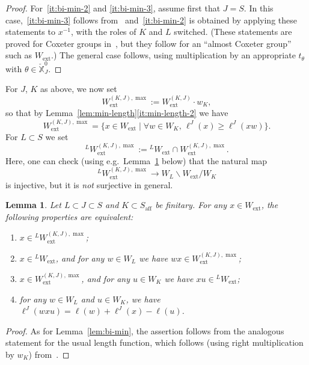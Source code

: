 \documentclass[11pt]{amsart}
\numberwithin{equation}{section}
\theoremstyle{plain}
\newtheorem{lem}[thm]{Lemma}
\theoremstyle{definition}
\newcommand{\X}{{\mathbb X}}
\newcommand{\Xd}{\check{\X}}
\newcommand{\ex}{\mathrm{ext}}
\newcommand{\af}{\mathrm{aff}}
\begin{document}
\begin{proof}
For~\eqref{it:bi-min-2} and \eqref{it:bi-min-3}, assume first that $J=S$. In this case,~\eqref{it:bi-min-3} follows from~\cite[Lemma~2.1.9 and Theorem~2.1.12]{geck-pfeiffer} and~\eqref{it:bi-min-2} is obtained by applying these statements to $x^{-1}$, with the roles of $K$ and $L$ switched. (These statements are proved for Coxeter groups in~\cite{geck-pfeiffer}, but they follow for an ``almost Coxeter group'' such as $W_\ex$.)
The general case follows,
using multiplication by an appropriate $t_\theta$ with $\theta \in \Xd_J^0$.
\end{proof}

For $J$, $K$ as above, we now set
\[
W_\ex^{(K,J),\max} := W_\ex^{(K,J)} \cdot w_K,
\]
so that by Lemma~\ref{lem:min-length}\eqref{it:min-length-2}
we have
\[
W_\ex^{(K,J),\max} = \{x \in W_\ex \mid \forall w\in W_K, \, \ell^{J}(x)\geq \ell^{J}(xw) \}.
\]
For $L\subset S$ we set 
\[
{}^{L}W_\ex^{(K,J),\max}:={}^{L}W_\ex\cap W_\ex^{(K,{J}),\max}. 
\]
Here, one can check (using e.g.~Lemma~\ref{lem:quar-min-max} below) that the natural map
\[
{}^{L}W_\ex^{(K,J),\max} \to W_{L} \backslash W_\ex / W_K
\]
is injective, but it is \emph{not} surjective in general.

\begin{lem}
\label{lem:quar-min-max}
Let $L \subset J\subset S$ and $K\subset S_\af$ be finitary.
For 
any $x\in W_\ex$, the following properties are equivalent:
\begin{enumerate}
\item 
$x\in {}^{L} W_\ex^{(K,J),\max}$; 
\item 
$x\in {}^{L} W_\ex$, and for any $w\in W_{L}$ we have $wx\in W_\ex^{(K,J),\max}$; 
\item 
$x\in W_\ex^{(K,J),\max}$, and for any $u\in W_K$ we have $xu\in {}^{L} W_\ex$; 
\item 
for any $w\in W_{L}$ and $u\in W_K$, we have $\ell^J(wxu)=\ell(w)+\ell^J(x)-\ell(u)$. 
\end{enumerate}
\end{lem}

\begin{proof}
As for Lemma~\ref{lem:bi-min}, the assertion follows from the analogous statement for the usual length function, which follows (using right multiplication by $w_K$) from~\cite[Lemma~2.4]{AR23}.
\end{proof}
\end{document}
